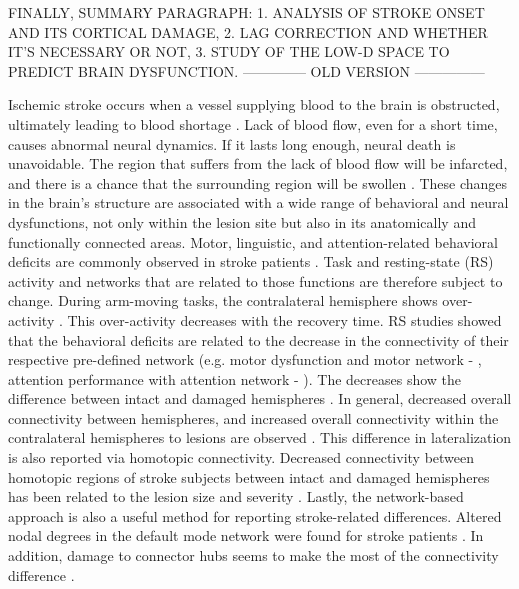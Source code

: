 \documentclass[fleqn,10pt]{wlscirep}
\begin{document}
FINALLY, SUMMARY PARAGRAPH: 1. ANALYSIS OF STROKE ONSET AND ITS CORTICAL DAMAGE, 2. LAG CORRECTION AND WHETHER IT'S NECESSARY OR NOT, 3. STUDY OF THE LOW-D SPACE TO PREDICT BRAIN DYSFUNCTION.
-------------- OLD VERSION ---------------

\color{green}Ischemic stroke occurs when a vessel supplying blood to the brain is obstructed, ultimately leading to blood shortage \citep{Roach_Bettermann_Biller_2010}. Lack of blood flow, even for a short time, causes abnormal neural dynamics. If it lasts long enough, neural death is unavoidable. The region that suffers from the lack of blood flow will be infarcted, and there is a chance that the surrounding region will be swollen \citep{hong2021hemorrhagic}.\color{black} These changes in the brain's structure are associated with a wide range of behavioral and neural dysfunctions, not only within the lesion site but also in its anatomically and functionally connected areas. Motor, linguistic, and attention-related behavioral deficits are commonly observed in stroke patients \citep{he2007breakdown, siegel2016disruptions}. Task and resting-state (RS) activity and networks that are related to those functions are therefore subject to change. During arm-moving tasks, the contralateral hemisphere shows over-activity \citep{rehme2011role}. This over-activity decreases with the recovery time. RS studies showed that the behavioral deficits are related to the decrease in the connectivity of their respective pre-defined network (e.g. motor dysfunction and motor network - \cite{carter2010resting}, attention performance with attention network - \cite{corbetta2002control}). The decreases show the difference between intact and damaged hemispheres \citep{carter2010resting}. In general, decreased overall connectivity between hemispheres, and increased overall connectivity within the contralateral hemispheres to lesions are observed \citep{new2015altered, yourganov2021effect}. This difference in lateralization is also reported via homotopic connectivity. Decreased connectivity between homotopic regions of stroke subjects between intact and damaged hemispheres has been related to the lesion size and severity \citep{urbin2014resting, tang2016decreased}. Lastly, the network-based approach is also a useful method for reporting stroke-related differences. Altered nodal degrees in the default mode network were found for stroke patients \citep{zhu2017disrupted}. In addition, damage to connector hubs seems to make the most of the connectivity difference \citep{gratton2012focal}. 
\end{document}
